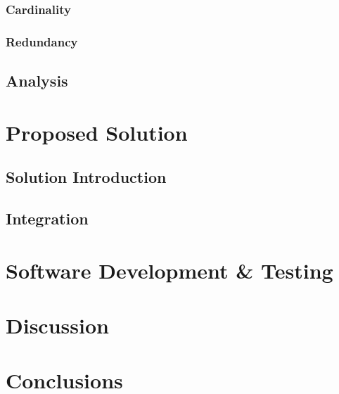 \documentclass{cslthse-msc}
\begin{document}
\subsection{Cardinality}
\subsection{Redundancy}
\section{Analysis}


\chapter{Proposed Solution}
\section{Solution Introduction}
\section{Integration}

\chapter{Software Development \& Testing}

\chapter{Discussion}

\chapter{Conclusions}


\begin{appendices}

\end{appendices}
\end{document}
